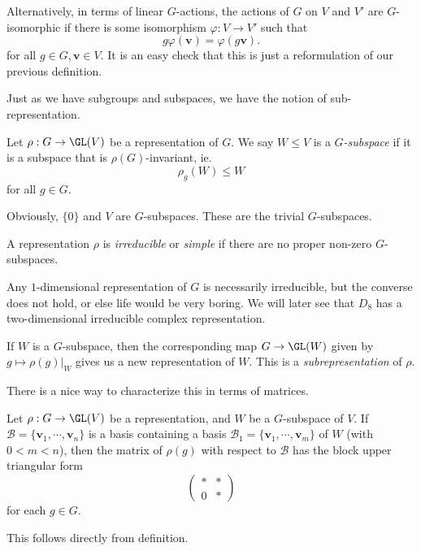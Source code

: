 \documentclass[a4paper]{article}
\begin{document}
Alternatively, in terms of linear $G$-actions, the actions of $G$ on $V$ and $V'$ are $G$-isomorphic if there is some isomorphism $\varphi: V \to V'$ such that
\[
  g \varphi(\mathbf{v}) = \varphi(g\mathbf{v}).
\]
for all $g \in G, \mathbf{v} \in V$. It is an easy check that this is just a reformulation of our previous definition.

Just as we have subgroups and subspaces, we have the notion of sub-representation.
\begin{defi}[$G$-subspace]
  Let $\rho: G \to \GL(V)$ be a representation of $G$. We say $W \leq V$ is a \emph{$G$-subspace} if it is a subspace that is $\rho(G)$-invariant, ie.
  \[
    \rho_g(W) \leq W
  \]
  for all $g \in G$.
\end{defi}

Obviously, $\{0\}$ and $V$ are $G$-subspaces. These are the trivial $G$-subspaces.

\begin{defi}
  A representation $\rho$ is \emph{irreducible} or \emph{simple} if there are no proper non-zero $G$-subspaces.
\end{defi}

\begin{eg}
  Any $1$-dimensional representation of $G$ is necessarily irreducible, but the converse does not hold, or else life would be very boring. We will later see that $D_8$ has a two-dimensional irreducible complex representation.
\end{eg}

\begin{defi}[Subrepresentation]
  If $W$ is a $G$-subspace, then the corresponding map $G \to \GL(W)$ given by $g \mapsto \rho(g)|_W$ gives us a new representation of $W$. This is a \emph{subrepresentation} of $\rho$.
\end{defi}

There is a nice way to characterize this in terms of matrices.
\begin{lemma}
  Let $\rho: G \to \GL(V)$ be a representation, and $W$ be a $G$-subspace of $V$. If $\mathcal{B} = \{\mathbf{v}_1, \cdots, \mathbf{v}_n\}$ is a basis containing a basis $\mathcal{B}_1 = \{\mathbf{v}_1, \cdots, \mathbf{v}_m\}$ of $W$ (with $0 < m < n$), then the matrix of $\rho(g)$ with respect to $\mathcal{B}$ has the block upper triangular form
  \[
    \begin{pmatrix}
      * & *\\
      0 & *
    \end{pmatrix}
  \]
  for each $g \in G$.
\end{lemma}
This follows directly from definition.
\end{document}
